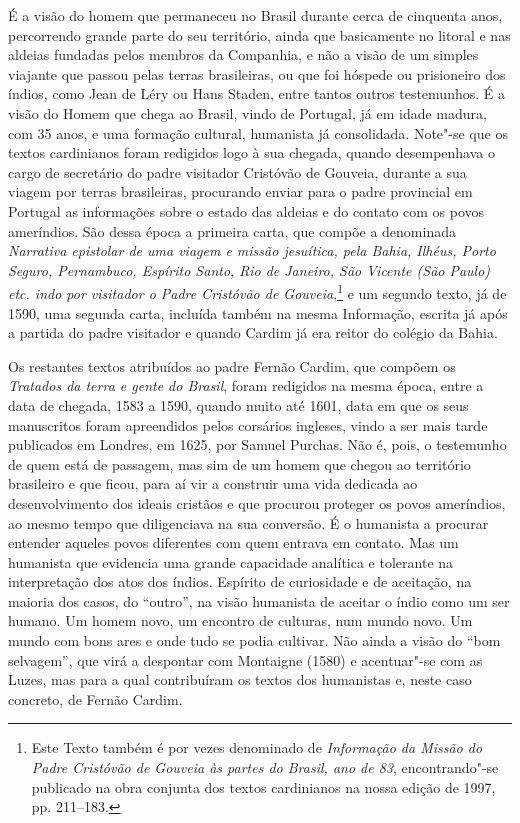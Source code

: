 É a visão do homem que permaneceu no Brasil durante cerca de
cinquenta anos, percorrendo grande parte do seu território, ainda que
basicamente no litoral e nas aldeias fundadas pelos membros da
Companhia, e não a visão de um simples viajante que passou pelas
terras brasileiras, ou que foi hóspede ou prisioneiro dos índios, como
Jean de Léry ou Hans Staden, entre tantos outros testemunhos. É a visão 
do Homem que chega ao Brasil, vindo de Portugal, já em idade
madura, com 35 anos, e uma formação cultural, humanista já
consolidada. Note"-se que os textos cardinianos foram redigidos logo à
sua chegada, quando desempenhava o cargo de secretário do padre
visitador Cristóvão de Gouveia, durante a sua viagem por terras
brasileiras, procurando enviar para o padre provincial em Portugal as
informações sobre o estado das aldeias e do contato com os povos
ameríndios. São dessa época a primeira carta, que compõe a denominada
\textit{Narrativa epistolar de uma viagem e missão jesuítica, pela
Bahia, Ilhéus, Porto Seguro, Pernambuco, Espírito Santo, Rio de
Janeiro, São Vicente (São Paulo) etc. indo por visitador o
Padre Cristóvão de Gouveia},\footnote{ Este Texto também
é por vezes denominado de \textit{Informação da Missão do Padre
Cristóvão de Gouveia às partes do Brasil, ano de 83}, encontrando"-se
publicado na obra conjunta dos textos cardinianos na nossa edição de 1997, 
pp. 211--183.} e um segundo texto, já de 1590, uma segunda carta, incluída
também na mesma Informação, escrita já após a partida do padre
visitador e quando Cardim já era reitor do colégio da Bahia.

Os restantes textos atribuídos ao padre Fernão Cardim, que compõem os
\textit{Tratados da terra e gente do Brasil}, foram redigidos na mesma
época, entre a data de chegada, 1583 a 1590, quando muito até 1601,
data em que os seus manuscritos foram apreendidos pelos corsários
ingleses, vindo a ser mais tarde publicados em Londres, em 1625, por
Samuel Purchas. Não é, pois, o testemunho de quem está de passagem, mas
sim de um homem que chegou ao território brasileiro e que ficou, para
aí vir a construir uma vida dedicada ao desenvolvimento dos ideais
cristãos e que procurou proteger os povos ameríndios, ao mesmo tempo
que diligenciava na sua conversão. 
É o humanista a procurar entender aqueles povos diferentes com quem
entrava em contato. Mas um humanista que evidencia uma grande
capacidade analítica e tolerante na interpretação dos atos dos índios.
Espírito de curiosidade e de aceitação, na maioria dos casos, do
``outro'', na visão humanista de aceitar o índio como um ser humano. Um
homem novo, um encontro de culturas, num mundo novo. Um mundo com bons
ares e onde tudo se podia cultivar. Não ainda a visão do ``bom
selvagem'', que virá a despontar com Montaigne (1580) e acentuar"-se com
as Luzes, mas para a qual contribuíram os textos dos humanistas e, neste
caso concreto, de Fernão Cardim.

